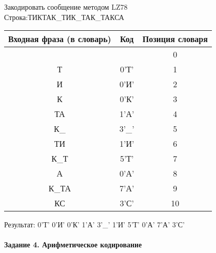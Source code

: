 \documentclass[a4paper, 12pt]{article}
\begin{document}
Закодировать сообщение методом LZ78\\
Строка:ТИКТАК\_ТИК\_ТАК\_ТАКСА\\
\begin{table}[h!]
\centering
\begin{tabular}{|c|c|c|} 
\hline
 Входная фраза (в словарь) & Код & Позиция словаря \\ \hline

 &  & 0 \\ \hline
Т & 0'Т' & 1 \\ \hline
И & 0'И' & 2 \\ \hline
К & 0'К' & 3 \\ \hline
ТА & 1'А' & 4 \\ \hline
К\_ & 3'\_' & 5 \\ \hline
ТИ & 1'И' & 6 \\ \hline
К\_Т & 5'Т' & 7 \\ \hline
А & 0'А' & 8 \\ \hline
К\_ТА & 7'А' & 9 \\ \hline
КС & 3'С' & 10 \\ \hline
\end{tabular}
\end{table}

Результат: 0'Т' 0'И' 0'К' 1'А' 3'\_' 1'И' 5'Т' 0'А' 7'А' 3'С'\\
\pagebreak
\paragraph{Задание 4. Арифметическое кодирование\\}
\end{document}
